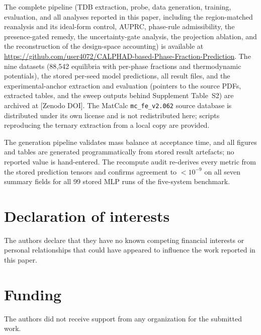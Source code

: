 \documentclass[preprint,12pt,authoryear]{elsarticle}
\begin{document}
The complete pipeline (TDB extraction, probe, data generation, training,
evaluation, and all analyses reported in this paper, including the
region-matched reanalysis and its ideal-form control, AUPRC,
phase-rule admissibility, the
presence-gated remedy, the uncertainty-gate analysis, the projection
ablation, and the reconstruction of the design-space accounting) is
available at \url{https://github.com/user4072/CALPHAD-based-Phase-Fraction-Prediction}. The nine datasets (88{,}542 equilibria with
per-phase fractions and thermodynamic potentials), the stored per-seed
model predictions, all result files, and the experimental-anchor
extraction and evaluation (pointers to the source PDFs, extracted tables, and
the sweep outputs behind Supplement Table~S2) are archived at [Zenodo
DOI]. The MatCalc
\texttt{mc\_fe\_v2.062} source database is distributed under its own
license and is not redistributed here; scripts reproducing the ternary
extraction from a local copy are provided.

The generation pipeline validates mass balance at acceptance time, and all
figures and tables are generated programmatically from stored result
artefacts; no reported value is hand-entered. The recompute audit re-derives
every metric from the stored prediction tensors and confirms agreement to
$<10^{-9}$ on all seven summary fields for all 99 stored MLP runs of the
five-system benchmark.

\section*{Declaration of interests}

The authors declare that they have no known competing financial interests
or personal relationships that could have appeared to influence the work
reported in this paper.

\section*{Funding}

The authors did not receive support from any organization for the submitted
work.
\end{document}
